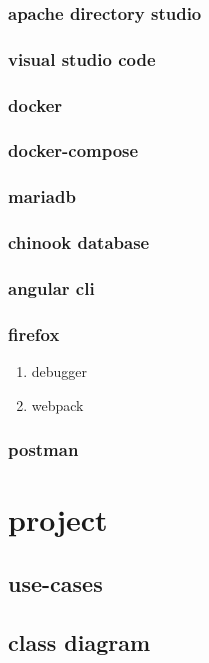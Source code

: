 \documentclass[11pt]{article}
\begin{document}
\subsubsection{apache directory studio}
\label{sec:org3786bdc}
\subsubsection{visual studio code}
\label{sec:org45e79ed}
\subsubsection{docker}
\label{sec:orgdd3e870}
\subsubsection{docker-compose}
\label{sec:orgf6bc2ed}
\subsubsection{mariadb}
\label{sec:org9eba444}
\subsubsection{chinook database}
\label{sec:org7840f6d}
\subsubsection{angular cli}
\label{sec:org5da6208}
\subsubsection{firefox}
\label{sec:org6affa2d}
\begin{enumerate}
\item debugger
\label{sec:orgd3920de}
\item webpack
\label{sec:org70f6d3d}
\end{enumerate}
\subsubsection{postman}
\label{sec:orgaf42c03}
\section{project}
\label{sec:orgaf8e72a}
\subsection{use-cases}
\label{sec:orgbb5e5b4}
\subsection{class diagram}
\label{sec:orgc484ead}
\end{document}
